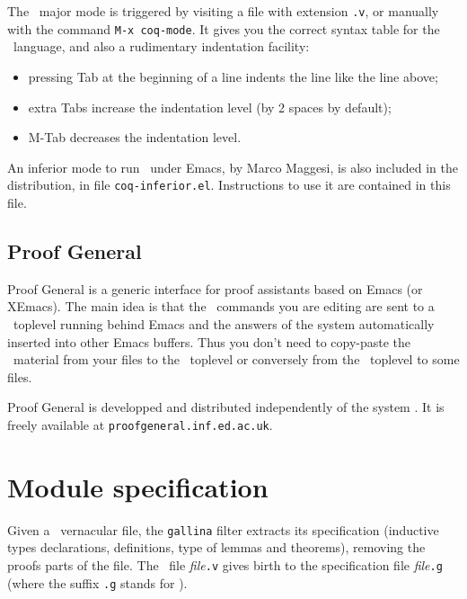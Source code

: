 The \Coq\ major mode is triggered by visiting a file with extension {\tt .v},
or manually with the command \verb!M-x coq-mode!.
It gives you the correct syntax table for
the \Coq\ language, and also a rudimentary indentation facility:
\begin{itemize}
  \item pressing {\sc Tab} at the beginning of a line indents the line like
    the line above;

  \item extra {\sc Tab}s increase the indentation level
    (by 2 spaces by default);

  \item M-{\sc Tab} decreases the indentation level.
\end{itemize}

An inferior mode to run \Coq\ under Emacs, by Marco Maggesi, is also
included in the distribution, in file \texttt{coq-inferior.el}.
Instructions to use it are contained in this file.

\subsection[Proof General]{Proof General}

Proof General is a generic interface for proof assistants based on
Emacs (or XEmacs). The main idea is that the \Coq\ commands you are
editing are sent to a \Coq\ toplevel running behind Emacs and the
answers of the system automatically inserted into other Emacs buffers. 
Thus you don't need to copy-paste the \Coq\ material from your files
to the \Coq\ toplevel or conversely from the \Coq\ toplevel to some
files. 

Proof General is developped and distributed independently of the
system \Coq. It is freely available at \verb!proofgeneral.inf.ed.ac.uk!.


\section[Module specification]{Module specification\label{gallina}}

Given a \Coq\ vernacular file, the {\tt gallina} filter extracts its
specification (inductive types declarations, definitions, type of
lemmas and theorems), removing the proofs parts of the file. The \Coq\
file {\em file}{\tt.v} gives birth to the specification file
{\em file}{\tt.g} (where the suffix {\tt.g} stands for \gallina).

